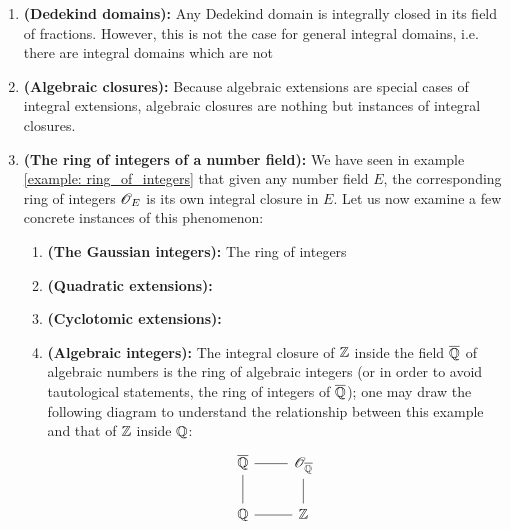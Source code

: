                 \begin{example}
                    \noindent
                    \begin{enumerate}
                        \item \textbf{(Dedekind domains):} Any Dedekind domain is integrally closed in its field of fractions. However, this is not the case for general integral domains, i.e. there are integral domains which are not 
                        \item \textbf{(Algebraic closures):} Because algebraic extensions are special cases of integral extensions, algebraic closures are nothing but instances of integral closures.
                        \item \textbf{(The ring of integers of a number field):} We have seen in example \ref{example: ring_of_integers} that given any number field $E$, the corresponding ring of integers $\mathscr{O}_E$ is its own integral closure in $E$. Let us now examine a few concrete instances of this phenomenon:
                            \begin{enumerate}
                                \item \textbf{(The Gaussian integers):} The ring of integers 
                                \item \textbf{(Quadratic extensions):}
                                \item \textbf{(Cyclotomic extensions):}
                                \item \textbf{(Algebraic integers):} The integral closure of $\mathbb{Z}$ inside the field $\overline{\mathbb{Q}}$ of algebraic numbers is the ring of algebraic integers (or in order to avoid tautological statements, the ring of integers of $\overline{\mathbb{Q}}$); one may draw the following diagram to understand the relationship between this example and that of $\mathbb{Z}$ inside $\mathbb{Q}$:
                                    $$
                                        \begin{tikzcd}
                                        	\overline{\Q} & {\scrO_{\overline{\Q}}} \\
                                        	\Q & \Z
                                        	\arrow[no head, from=2-1, to=1-1]
                                        	\arrow[no head, from=2-2, to=1-2]
                                        	\arrow[no head, from=1-1, to=1-2]
                                        	\arrow[no head, from=2-1, to=2-2]
                                        \end{tikzcd}
                                    $$
                            \end{enumerate}
                    \end{enumerate}
                \end{example}
